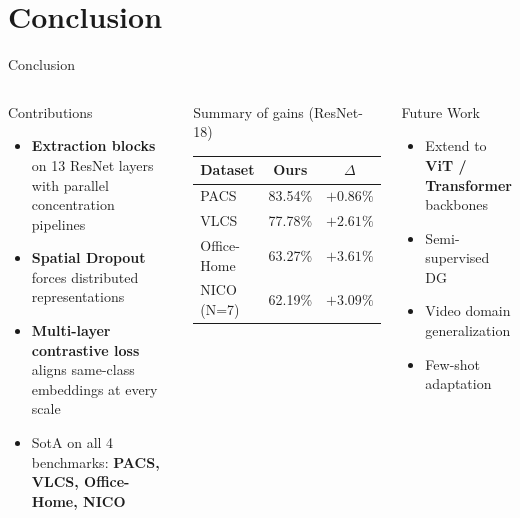 \documentclass[aspectratio=169,10pt]{beamer}
\newcommand{\good}[1]{\textcolor{GreenOK}{\textbf{#1}}}
\begin{document}
\section{Conclusion}

\begin{frame}{Conclusion}
  \begin{columns}[T]
      \begin{block}{Contributions}
        \begin{itemize}
          \item[\good{$\checkmark$}] \textbf{Extraction blocks} on 13 ResNet layers with parallel concentration pipelines
          \item[\good{$\checkmark$}] \textbf{Spatial Dropout} forces distributed representations
          \item[\good{$\checkmark$}] \textbf{Multi-layer contrastive loss} aligns same-class embeddings at every scale
          \item[\good{$\checkmark$}] SotA on all 4 benchmarks: \good{PACS, VLCS, Office-Home, NICO}
        \end{itemize}
      \end{block}

      \vspace{0.3em}
      \begin{exampleblock}{Summary of gains (ResNet-18)}
        \small
        \begin{tabular}{@{}lcc@{}}
          \toprule
          Dataset & Ours & $\Delta$ \\
          \midrule
          PACS        & 83.54\% & $+0.86\%$ \\
          VLCS        & 77.78\% & $+2.61\%$ \\
          Office-Home & 63.27\% & $+3.61\%$ \\
          NICO (N=7)  & 62.19\% & $+3.09\%$ \\
          \bottomrule
        \end{tabular}
      \end{exampleblock}

      \begin{alertblock}{Future Work}
        \begin{itemize}
          \item Extend to \textbf{ViT / Transformer} backbones
          \item Semi-supervised DG
          \item Video domain generalization
          \item Few-shot adaptation
        \end{itemize}
      \end{alertblock}


\end{columns}
\end{frame}
\end{document}
